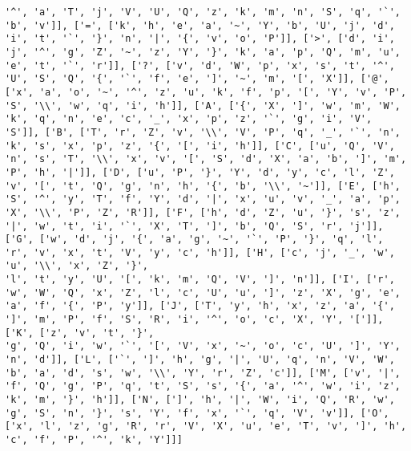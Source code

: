 \documentclass{article}
\begin{document}
\begin{verbatim}
'^', 'a', 'T', 'j', 'V', 'U', 'Q', 'z', 'k', 'm', 'n', 'S', 'q', '`', 'b', 'v']], ['=', ['k', 'h', 'e', 'a', '~', 'Y', 'b', 'U', 'j', 'd', 'i', 't', '`', '}', 'n', '|', '{', 'v', 'o', 'P']], ['>', ['d', 'i', 'j', '^', 'g', 'Z', '~', 'z', 'Y', '}', 'k', 'a', 'p', 'Q', 'm', 'u', 'e', 't', '`', 'r']], ['?', ['v', 'd', 'W', 'p', 'x', 's', 't', '^', 'U', 'S', 'Q', '{', '`', 'f', 'e', ']', '~', 'm', '[', 'X']], ['@', ['x', 'a', 'o', '~', '^', 'z', 'u', 'k', 'f', 'p', '[', 'Y', 'v', 'P', 'S', '\\', 'w', 'q', 'i', 'h']], ['A', ['{', 'X', ']', 'w', 'm', 'W', 'k', 'q', 'n', 'e', 'c', '_', 'x', 'p', 'z', '`', 'g', 'i', 'V', 'S']], ['B', ['T', 'r', 'Z', 'v', '\\', 'V', 'P', 'q', '_', '`', 'n', 'k', 's', 'x', 'p', 'z', '{', '[', 'i', 'h']], ['C', ['u', 'Q', 'V', 'n', 's', 'T', '\\', 'x', 'v', '[', 'S', 'd', 'X', 'a', 'b', ']', 'm', 'P', 'h', '|']], ['D', ['u', 'P', '}', 'Y', 'd', 'y', 'c', 'l', 'Z', 'v', '[', 't', 'Q', 'g', 'n', 'h', '{', 'b', '\\', '~']], ['E', ['h', 'S', '^', 'y', 'T', 'f', 'Y', 'd', '|', 'x', 'u', 'v', '_', 'a', 'p', 'X', '\\', 'P', 'Z', 'R']], ['F', ['h', 'd', 'Z', 'u', '}', 's', 'z', '|', 'w', 't', 'i', '`', 'X', 'T', ']', 'b', 'Q', 'S', 'r', 'j']], ['G', ['w', 'd', 'j', '{', 'a', 'g', '~', '`', 'P', '}', 'q', 'l', 'r', 'v', 'x', 't', 'V', 'y', 'c', 'h']], ['H', ['c', 'j', '_', 'w', 'u', '\\', 'x', 'Z', '}', 
'l', 't', 'y', 'U', '[', 'k', 'm', 'Q', 'V', ']', 'n']], ['I', ['r', 'w', 'W', 'Q', 'x', 'Z', 'l', 'c', 'U', 'u', ']', 'z', 'X', 'g', 'e', 'a', 'f', '{', 'P', 'y']], ['J', ['T', 'y', 'h', 'x', 'z', 'a', '{', ']', 'm', 'P', 'f', 'S', 'R', 'i', '^', 'o', 'c', 'X', 'Y', '[']], ['K', ['z', 'v', 't', '}', 
'g', 'Q', 'i', 'w', '`', '[', 'V', 'x', '~', 'o', 'c', 'U', ']', 'Y', 'n', 'd']], ['L', ['`', ']', 'h', 'g', '|', 'U', 'q', 'n', 'V', 'W', 'b', 'a', 'd', 's', 'w', '\\', 'Y', 'r', 'Z', 'c']], ['M', ['v', '|', 'f', 'Q', 'g', 'P', 'q', 't', 'S', 's', '{', 'a', '^', 'w', 'i', 'z', 'k', 'm', '}', 'h']], ['N', [']', 'h', '|', 'W', 'i', 'Q', 'R', 'w', 'g', 'S', 'n', '}', 's', 'Y', 'f', 'x', '`', 'q', 'V', 'v']], ['O', ['x', 'l', 'z', 'g', 'R', 'r', 'V', 'X', 'u', 'e', 'T', 'v', ']', 'h', 'c', 'f', 'P', '^', 'k', 'Y']]]

\end{verbatim}
\end{document}
